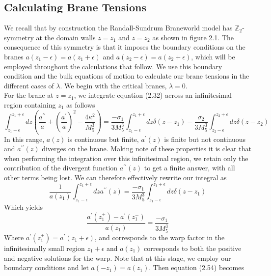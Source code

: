\documentclass[11pt]{report}
\numberwithin{equation}{chapter}
\begin{document}
\subsection{Calculating Brane Tensions}
We recall that by construction the Randall-Sundrum Braneworld model has $\mathbb{Z}_2$-symmetry at the domain walls $z=z_1$ and $z=z_2$ as shown in figure 2.1. The consequence of this symmetry is that it imposes the boundary conditions on the branes $a(z_1-\epsilon)=a(z_1+\epsilon)$ and $a(z_2-\epsilon) = a(z_2+\epsilon)$, which will be employed throughout the calculations that follow. We use this boundary condition and the bulk equations of motion to calculate our brane tensions in the different cases of $\lambda$.
We begin with the critical branes, $\lambda = 0$.\\
For the brane at $z=z_1$, we integrate equation (2.32) across an infinitesimal region containing $z_1$ as follows
\begin{equation}
    \int^{z_1+\epsilon}_{z_1-\epsilon}dz\left(\frac{a^{\prime\prime}}{a}+\left(\frac{a^\prime}{a}\right)^2-\frac{4\kappa^2}{M^3_5}\right)=\frac{-\sigma_1}{3M^3_5} \int^{z_1+\epsilon}_{z_1-\epsilon}dz\delta\left(z-z_1\right)-\frac{\sigma_2}{3M^3_5}\int^{z_2+\epsilon}_{z_2-\epsilon}dz\delta\left(z-z_2\right)
\end{equation}
In this range, $a(z)$ is continuous but finite, $a^\prime(z)$ is finite but not continuous and $a^{\prime\prime}(z)$ diverges on the brane. Making note of these properties it is clear that when performing the integration over this infinitesimal region, we retain only the contribution of the divergent function $a^{\prime\prime}(z)$ to get a finite answer, with all other terms being lost. We can therefore effectively rewrite our integral as
\begin{equation}
    \frac{1}{a\left(z_1\right)}\int^{z_1+\epsilon}_{z_1-\epsilon}dza^{\prime\prime}\left(z\right)=\frac{-\sigma_1}{3M^3_5} \int^{z_1+\epsilon}_{z_1-\epsilon}dz\delta\left(z-z_1\right)
\end{equation}
Which yields
\begin{equation}
    \frac{a^\prime\left(z^{+}_1\right)-a^\prime\left(z^{-}_1\right)}{a\left(z_1\right)}=\frac{-\sigma_1}{3M^3_5}
\end{equation}
Where $a^{\prime}(z_1^+) = a^{\prime}(z_1 + \epsilon)$, and corresponds to the warp factor in the infinitesimally small region $z_1+\epsilon$ and $a(z_1)$ corresponds to both the positive and negative solutions for the warp. Note that at this stage, we employ our boundary conditions and let $a(-z_1) = a(z_1)$. Then equation (2.54) becomes
\end{document}
